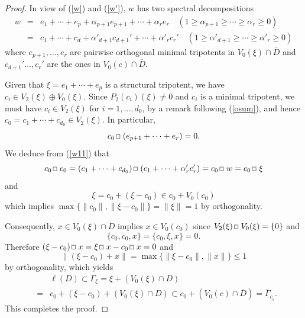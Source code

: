 \documentclass[12pt, twoside]{article}
\def\sqr#1#2{{\,\vcenter{\vbox{\hrule height.#2pt\hbox{\vrule width.#2pt
height#1pt \kern#1pt\vrule width.#2pt}\hrule height.#2pt}}\,}}
\def\bo{\sqr44\,}
\theoremstyle{definition}
\numberwithin{equation}{section}
\begin{document}
\begin{proof}
In  view of (\ref{w}) and (\ref{w'}),  $w$ has two spectral decompositions
\begin{eqnarray}\label{w11}
w &=& e_1 + \cdots + e_p + \alpha_{ p+1}e_{ p+1} + \cdots + \alpha_{r}e_{r}
\quad (1 \geq \alpha_{p+1} \geq \cdots \geq \alpha_r \geq 0)\nonumber\\
&=& c_1 + \cdots + c_d + \alpha'_{d+1} c_{d+1}' + \cdots + \alpha'_{r}c_{r}'
\quad (1 \geq \alpha'_{d+1} \geq \cdots \geq \alpha'_r \geq 0)
\end{eqnarray}
where $e_{p+1}, \ldots, e_r $ are pairwise orthogonal minimal tripotents in $V_0(\xi) \cap \overline D$ and
$c_{d+1}' \ldots, c_r'$ are the ones in $V_0(c) \cap \overline{D}$.

Given that $\xi = e_1 + \cdots+e_p$ is a structural tripotent, we have $c_i \in V_2(\xi) \oplus V_0(\xi)$.
Since $P_2(c_i)(\xi) \neq 0$ and $c_i$ is a minimal tripotent, we must have $c_i \in V_2(\xi)$ for
$i=1, \ldots, d_0$,
by a remark following (\ref{osum}), and hence $c_0=c_1 + \cdots +c_{d_0}\in V_2(\xi)$.
In particular, $$c_0 \bo (e_{p+1} + \cdots +e_{r}) =0.$$
We deduce from (\ref{w11}) that
 $$c_0 \bo c_0 =(c_1 + \cdots +c_{d_0}) \bo (c_1 + \cdots +\alpha'_{r} c_{r}') = c_0 \bo w = c_0 \bo \xi$$
 and
 \begin{equation}\label{xc0}
 \xi = c_0 + (\xi-c_0) \in c_0 + V_0(c_0)
 \end{equation}
 which implies $\max \{\|c_0\|, \|\xi-c_0\|\} = \|\xi\|=1$ by orthogonality.

Consequently, $x\in V_0(\xi)\cap D$ implies $x \in V_0(c_0)$ since $V_2(\xi) \bo V_0(\xi)= \{0\}$ and
$$\{c_0,c_0, x\} = \{c_0, \xi,x\}=0.$$ Therefore $(\xi - c_0) \bo x = \xi \bo x - c_0\bo x =0$
and
$$\|( \xi- c_0) + x\| = \max\{\| \xi-c_0\|, \|x\|\} \leq 1$$ by orthogonality,
which yields
\begin{eqnarray*}\label{cperp}
&&\ell(D) \subset  \Gamma_\xi = \xi + (V_0(\xi) \cap D)\\
& = & c_0  + (\xi-c_0)+ (V_0(\xi) \cap D)
 \subset  c_0+ (V_0(c) \cap \overline D)=\overline\Gamma_{c_{_0}}.
\end{eqnarray*}
This completes the proof.
\end{proof}
\end{document}
